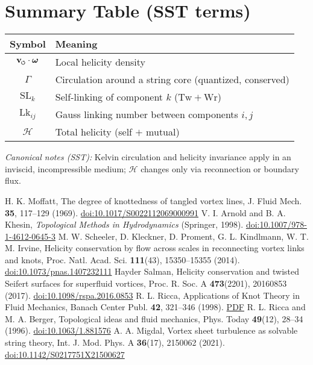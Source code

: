 \documentclass[aps,prb,amsmath,amssymb]{revtex4-2} %
\newcommand{\swirlarrow}{%
    \mathchoice{\mkern-2mu\boldsymbol{\circlearrowleft}}%
    {\mkern-2mu\boldsymbol{\circlearrowleft}}%
    {\mkern-2mu\scriptscriptstyle\boldsymbol{\circlearrowleft}}%
    {\mkern-2mu\scriptscriptstyle\boldsymbol{\circlearrowleft}}%
}
\newcommand{\vswirl}{\mathbf{v}_{\swirlarrow}}                %
\newcommand{\vv}{\vswirl}                                     %
\newcommand{\ww}{\boldsymbol{\omega}}   %
\newcommand{\Hcal}{\mathcal{H}}         %
\newcommand{\SL}{\mathrm{SL}}           %
\newcommand{\Lk}{\mathrm{Lk}}           %
\begin{document}
    \section*{Summary Table (SST terms)}
        \begin{tabular}{|c|l|}
            \hline
            \textbf{Symbol} & \textbf{Meaning} \\
            \hline
            $\vv \cdot \ww$  & Local helicity density \\
            $\Gamma$        & Circulation around a string core (quantized, conserved) \\
            $\SL_k$         & Self-linking of component $k$ ($\mathrm{Tw}+\mathrm{Wr}$) \\
            $\Lk_{ij}$      & Gauss linking number between components $i,j$ \\
            $\Hcal$         & Total helicity (self $+$ mutual) \\
            \hline
        \end{tabular}

        \vspace{1em}
        \noindent\textit{Canonical notes (SST):} Kelvin circulation and helicity invariance apply in an inviscid,
        incompressible medium; $\Hcal$ changes only via reconnection or boundary flux.


    \begin{thebibliography}{9}\setlength{\itemsep}{1pt}
         H. K. Moffatt, The degree of knottedness of tangled vortex lines, J. Fluid Mech. \textbf{35}, 117--129 (1969). \href{https://doi.org/10.1017/S0022112069000991}{doi:10.1017/S0022112069000991}
         V. I. Arnold and B. A. Khesin, \textit{Topological Methods in Hydrodynamics} (Springer, 1998). \href{https://doi.org/10.1007/978-1-4612-0645-3}{doi:10.1007/978-1-4612-0645-3}
         M. W. Scheeler, D. Kleckner, D. Proment, G. L. Kindlmann, W. T. M. Irvine, Helicity conservation by flow across scales in reconnecting vortex links and knots, Proc. Natl. Acad. Sci. \textbf{111}(43), 15350--15355 (2014). \href{https://doi.org/10.1073/pnas.1407232111}{doi:10.1073/pnas.1407232111}
         Hayder Salman, Helicity conservation and twisted Seifert surfaces for superfluid vortices, Proc. R. Soc. A \textbf{473}(2201), 20160853 (2017). \href{https://doi.org/10.1098/rspa.2016.0853}{doi:10.1098/rspa.2016.0853}
         R. L. Ricca, Applications of Knot Theory in Fluid Mechanics, Banach Center Publ. \textbf{42}, 321--346 (1998). \href{https://bibliotekanauki.pl/articles/1342426.pdf}{PDF}
         R. L. Ricca and M. A. Berger, Topological ideas and fluid mechanics, Phys. Today \textbf{49}(12), 28--34 (1996). \href{https://doi.org/10.1063/1.881576}{doi:10.1063/1.881576}
         A. A. Migdal, Vortex sheet turbulence as solvable string theory, Int. J. Mod. Phys. A \textbf{36}(17), 2150062 (2021). \href{https://doi.org/10.1142/S0217751X21500627}{doi:10.1142/S0217751X21500627}
    \end{thebibliography}
\end{document}
